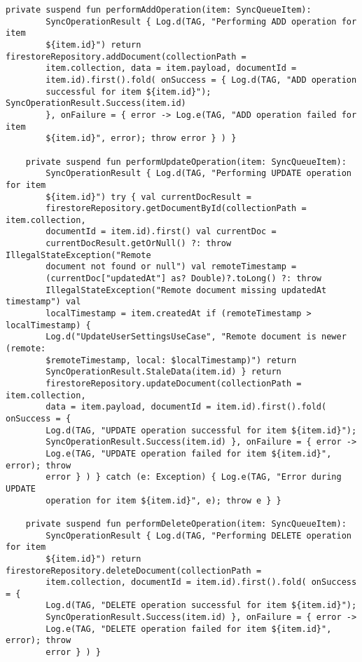 \begin{lstlisting}[caption=Operazioni di Sincronizzazione, label=lst:sync_operations, basicstyle=\ttfamily\scriptsize, breaklines=true, breakatwhitespace=true, tabsize=4]
    private suspend fun performAddOperation(item: SyncQueueItem):
        SyncOperationResult { Log.d(TAG, "Performing ADD operation for item
        ${item.id}") return firestoreRepository.addDocument(collectionPath =
        item.collection, data = item.payload, documentId =
        item.id).first().fold( onSuccess = { Log.d(TAG, "ADD operation
        successful for item ${item.id}"); SyncOperationResult.Success(item.id)
        }, onFailure = { error -> Log.e(TAG, "ADD operation failed for item
        ${item.id}", error); throw error } ) }

    private suspend fun performUpdateOperation(item: SyncQueueItem):
        SyncOperationResult { Log.d(TAG, "Performing UPDATE operation for item
        ${item.id}") try { val currentDocResult =
        firestoreRepository.getDocumentById(collectionPath = item.collection,
        documentId = item.id).first() val currentDoc =
        currentDocResult.getOrNull() ?: throw IllegalStateException("Remote
        document not found or null") val remoteTimestamp =
        (currentDoc["updatedAt"] as? Double)?.toLong() ?: throw
        IllegalStateException("Remote document missing updatedAt timestamp") val
        localTimestamp = item.createdAt if (remoteTimestamp > localTimestamp) {
        Log.d("UpdateUserSettingsUseCase", "Remote document is newer (remote:
        $remoteTimestamp, local: $localTimestamp)") return
        SyncOperationResult.StaleData(item.id) } return
        firestoreRepository.updateDocument(collectionPath = item.collection,
        data = item.payload, documentId = item.id).first().fold( onSuccess = {
        Log.d(TAG, "UPDATE operation successful for item ${item.id}");
        SyncOperationResult.Success(item.id) }, onFailure = { error ->
        Log.e(TAG, "UPDATE operation failed for item ${item.id}", error); throw
        error } ) } catch (e: Exception) { Log.e(TAG, "Error during UPDATE
        operation for item ${item.id}", e); throw e } }

    private suspend fun performDeleteOperation(item: SyncQueueItem):
        SyncOperationResult { Log.d(TAG, "Performing DELETE operation for item
        ${item.id}") return firestoreRepository.deleteDocument(collectionPath =
        item.collection, documentId = item.id).first().fold( onSuccess = {
        Log.d(TAG, "DELETE operation successful for item ${item.id}");
        SyncOperationResult.Success(item.id) }, onFailure = { error ->
        Log.e(TAG, "DELETE operation failed for item ${item.id}", error); throw
        error } ) }
\end{lstlisting}

